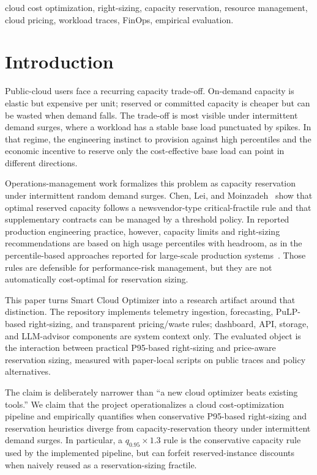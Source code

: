 \documentclass[conference]{IEEEtran}
\begin{document}
    \begin{IEEEkeywords}
    cloud cost optimization, right-sizing, capacity reservation, resource
    management, cloud pricing, workload traces, FinOps, empirical evaluation.
    \end{IEEEkeywords}

    \section{Introduction}

    Public-cloud users face a recurring capacity trade-off. On-demand capacity is
    elastic but expensive per unit; reserved or committed capacity is cheaper but
    can be wasted when demand falls. The trade-off is most visible under
    intermittent demand surges, where a workload has a stable base load punctuated
    by spikes. In that regime, the engineering instinct to provision against high
    percentiles and the economic incentive to reserve only the cost-effective base
    load can point in different directions.

    Operations-management work formalizes this problem as capacity reservation
    under intermittent random demand surges. Chen, Lei, and
    Moinzadeh~\cite{chen2024capacity} show that optimal reserved capacity follows
    a newsvendor-type critical-fractile rule and that supplementary contracts can
    be managed by a threshold policy. In reported production engineering practice,
    however, capacity limits and right-sizing recommendations are based on high usage
    percentiles with headroom, as in the percentile-based approaches reported for
    large-scale production systems~\cite{rzadca2020autopilot,cortez2017resource,cahoon2022doppler}.
    Those rules are defensible for performance-risk management, but they are not
    automatically cost-optimal for reservation sizing.

    This paper turns Smart Cloud Optimizer into a research artifact around that
    distinction. The repository implements telemetry ingestion, forecasting,
    PuLP-based right-sizing, and transparent pricing/waste rules; dashboard, API,
    storage, and LLM-advisor components are system context only. The evaluated
    object is the interaction between practical P95-based right-sizing and
price-aware reservation sizing, measured with paper-local scripts on public
traces and policy alternatives.

The claim is deliberately narrower than ``a new cloud optimizer beats existing
tools.'' We claim that the project operationalizes a cloud cost-optimization
pipeline and empirically quantifies when conservative P95-based right-sizing
and reservation heuristics diverge from capacity-reservation theory under
intermittent demand surges. In particular, a $q_{0.95}\times1.3$ rule is the
conservative capacity rule used by the implemented pipeline, but can forfeit
reserved-instance discounts when naively reused as a reservation-sizing
fractile.
\end{document}
